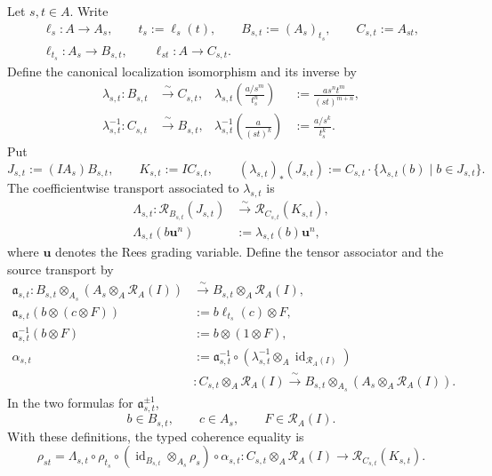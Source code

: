 \begin{lemma}
  \label{lemma:nagata-rees-localization-mul}

  Let $s,t\in A$.  Write
  \[
  \begin{gathered}
    \ell_s\colon A\to A_s,
    \qquad t_s:=\ell_s(t),
    \qquad B_{s,t}:=(A_s)_{t_s},
    \qquad C_{s,t}:=A_{st},\\
    \ell_{t_s}\colon A_s\to B_{s,t},
    \qquad \ell_{st}\colon A\to C_{s,t}.
  \end{gathered}
  \]
  Define the canonical localization isomorphism and its inverse by
  \[
  \begin{aligned}
    \lambda_{s,t}\colon B_{s,t}&\xrightarrow{\ \sim\ }C_{s,t},&
    \lambda_{s,t}\!\left(\frac{a/s^m}{t_s^n}\right)
      &:=\frac{a s^n t^m}{(st)^{m+n}},\\
    \lambda_{s,t}^{-1}\colon C_{s,t}&\xrightarrow{\ \sim\ }B_{s,t},&
    \lambda_{s,t}^{-1}\!\left(\frac a{(st)^k}\right)
      &:=\frac{a/s^k}{t_s^k}.
  \end{aligned}
  \]
  Put
  \[
    J_{s,t}:=(IA_s)B_{s,t},
    \qquad K_{s,t}:=IC_{s,t},
    \qquad
    (\lambda_{s,t})_*(J_{s,t})
      :=C_{s,t}\cdot
        \{\lambda_{s,t}(b)\mid b\in J_{s,t}\}.
  \]
  The coefficientwise transport associated to $\lambda_{s,t}$ is
  \[
  \begin{aligned}
    \Lambda_{s,t}\colon
      \mathcal R_{B_{s,t}}(J_{s,t})
      &\xrightarrow{\ \sim\ }
        \mathcal R_{C_{s,t}}(K_{s,t}),\\
    \Lambda_{s,t}(b\mathbf u^n)&:=\lambda_{s,t}(b)\mathbf u^n,
  \end{aligned}
  \]
  where $\mathbf u$ denotes the Rees grading variable.  Define the tensor
  associator and the source transport by
  \[
  \begin{aligned}
    \mathfrak a_{s,t}\colon
      B_{s,t}\otimes_{A_s}(A_s\otimes_A\mathcal R_A(I))
      &\xrightarrow{\ \sim\ }
        B_{s,t}\otimes_A\mathcal R_A(I),\\
    \mathfrak a_{s,t}(b\otimes(c\otimes F))
      &:=b\ell_{t_s}(c)\otimes F,\\
    \mathfrak a_{s,t}^{-1}(b\otimes F)&:=b\otimes(1\otimes F),\\[2pt]
    \alpha_{s,t}
      &:=\mathfrak a_{s,t}^{-1}\circ
        (\lambda_{s,t}^{-1}\otimes_A
          \operatorname{id}_{\mathcal R_A(I)})\\
      &\colon C_{s,t}\otimes_A\mathcal R_A(I)
        \xrightarrow{\ \sim\ }
        B_{s,t}\otimes_{A_s}(A_s\otimes_A\mathcal R_A(I)).
  \end{aligned}
  \]
  In the two formulas for $\mathfrak a_{s,t}^{\pm1}$,
  \[
    b\in B_{s,t},\qquad c\in A_s,
    \qquad F\in\mathcal R_A(I).
  \]
  With these definitions, the typed coherence equality is
  \[
  \boxed{
    \rho_{st}
      =\Lambda_{s,t}\circ\rho_{t_s}\circ
        (\operatorname{id}_{B_{s,t}}\otimes_{A_s}\rho_s)
        \circ\alpha_{s,t}}
    \colon C_{s,t}\otimes_A\mathcal R_A(I)
      \longrightarrow\mathcal R_{C_{s,t}}(K_{s,t}).
  \]
\end{lemma}

